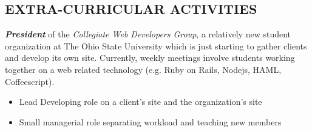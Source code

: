 \documentclass[line,margin=.2,letterpaper]{resume}
\begin{document}
\begin{resume}
\section{\uppercase{Extra-Curricular Activities}}             
    \emph{\textbf{President}} of the \emph{Collegiate Web Developers Group}, a relatively new student organization at The Ohio State University which is just starting to gather clients and develop its own site.  Currently, weekly meetings involve students working together on a web related technology (e.g. Ruby on Rails, Nodejs, HAML, Coffeescript).\\
    \vspace{-8pt}
	\begin{itemize}
	    \item Lead Developing role on a client's site and the organization's site
	    \item Small managerial role separating workload and teaching new members
	\end{itemize}
 
\end{resume}
\end{document}
